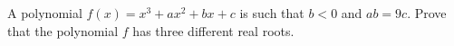 A polynomial $ f(x)=x^3+ax^2+bx+c$ is such that $ b<0$ and $ ab=9c$. Prove that the polynomial $ f$ has three different real roots.